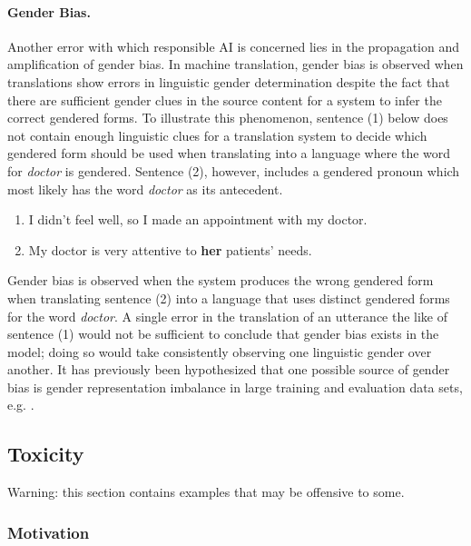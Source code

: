 \paragraph{Gender Bias.} Another error with which responsible AI is concerned lies in the propagation and amplification of gender bias. In machine translation, gender bias is observed when translations show errors in linguistic gender determination despite the fact that there are sufficient gender clues in the source content for a system to infer the correct gendered forms. To illustrate this phenomenon, sentence (1) below does not contain enough linguistic clues for a translation system to decide which gendered form should be used when translating into a language where the word for \textit{doctor} is gendered. Sentence (2), however, includes a gendered pronoun which most likely has the word \textit{doctor} as its antecedent.
\begin{enumerate}
\item I didn't feel well, so I made an appointment with my doctor.
\item My doctor is very attentive to \textbf{her} patients' needs.
\end{enumerate}
Gender bias is observed when the system produces the wrong gendered form when translating sentence (2) into a language that uses distinct gendered forms for the word \textit{doctor}. A single error in the translation of an utterance the like of sentence (1) would not be sufficient to conclude that gender bias exists in the model; doing so would take consistently observing one linguistic gender over another.
It has previously been hypothesized that one possible source of gender bias is gender representation imbalance in large training and evaluation data
sets, e.g. \citep{NEURIPS2022_09933f07,qian-etal-2022-perturbation}.








\subsection{Toxicity}
\label{apx:toxicity}

Warning: this section contains examples that may be offensive to some.



\subsubsection{Motivation}


